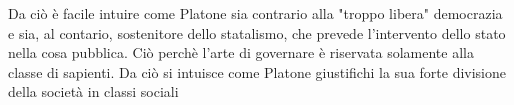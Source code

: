 \documentclass[10pt,a4paper]{article}
\begin{document}
Da ciò è facile intuire come Platone sia contrario alla "troppo libera" democrazia e sia, al contario, sostenitore dello statalismo, che prevede l'intervento dello stato nella cosa pubblica. Ciò perchè l'arte di governare è riservata solamente  alla classe di sapienti. Da ciò si intuisce come Platone giustifichi la sua forte divisione della società in classi sociali 
\end{document}
